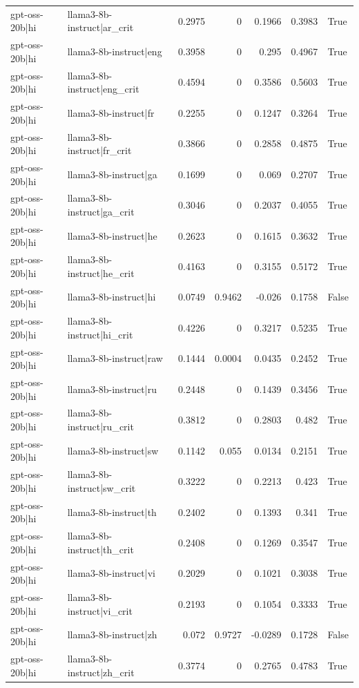 \begin{table}
\begin{tabular}{l l r r r r l}
gpt-oss-20b|hi & llama3-8b-instruct|ar_crit & 0.2975 & 0 & 0.1966 & 0.3983 & True \\
gpt-oss-20b|hi & llama3-8b-instruct|eng & 0.3958 & 0 & 0.295 & 0.4967 & True \\
gpt-oss-20b|hi & llama3-8b-instruct|eng_crit & 0.4594 & 0 & 0.3586 & 0.5603 & True \\
gpt-oss-20b|hi & llama3-8b-instruct|fr & 0.2255 & 0 & 0.1247 & 0.3264 & True \\
gpt-oss-20b|hi & llama3-8b-instruct|fr_crit & 0.3866 & 0 & 0.2858 & 0.4875 & True \\
gpt-oss-20b|hi & llama3-8b-instruct|ga & 0.1699 & 0 & 0.069 & 0.2707 & True \\
gpt-oss-20b|hi & llama3-8b-instruct|ga_crit & 0.3046 & 0 & 0.2037 & 0.4055 & True \\
gpt-oss-20b|hi & llama3-8b-instruct|he & 0.2623 & 0 & 0.1615 & 0.3632 & True \\
gpt-oss-20b|hi & llama3-8b-instruct|he_crit & 0.4163 & 0 & 0.3155 & 0.5172 & True \\
gpt-oss-20b|hi & llama3-8b-instruct|hi & 0.0749 & 0.9462 & -0.026 & 0.1758 & False \\
gpt-oss-20b|hi & llama3-8b-instruct|hi_crit & 0.4226 & 0 & 0.3217 & 0.5235 & True \\
gpt-oss-20b|hi & llama3-8b-instruct|raw & 0.1444 & 0.0004 & 0.0435 & 0.2452 & True \\
gpt-oss-20b|hi & llama3-8b-instruct|ru & 0.2448 & 0 & 0.1439 & 0.3456 & True \\
gpt-oss-20b|hi & llama3-8b-instruct|ru_crit & 0.3812 & 0 & 0.2803 & 0.482 & True \\
gpt-oss-20b|hi & llama3-8b-instruct|sw & 0.1142 & 0.055 & 0.0134 & 0.2151 & True \\
gpt-oss-20b|hi & llama3-8b-instruct|sw_crit & 0.3222 & 0 & 0.2213 & 0.423 & True \\
gpt-oss-20b|hi & llama3-8b-instruct|th & 0.2402 & 0 & 0.1393 & 0.341 & True \\
gpt-oss-20b|hi & llama3-8b-instruct|th_crit & 0.2408 & 0 & 0.1269 & 0.3547 & True \\
gpt-oss-20b|hi & llama3-8b-instruct|vi & 0.2029 & 0 & 0.1021 & 0.3038 & True \\
gpt-oss-20b|hi & llama3-8b-instruct|vi_crit & 0.2193 & 0 & 0.1054 & 0.3333 & True \\
gpt-oss-20b|hi & llama3-8b-instruct|zh & 0.072 & 0.9727 & -0.0289 & 0.1728 & False \\
gpt-oss-20b|hi & llama3-8b-instruct|zh_crit & 0.3774 & 0 & 0.2765 & 0.4783 & True \\

\end{tabular}
\end{table}
